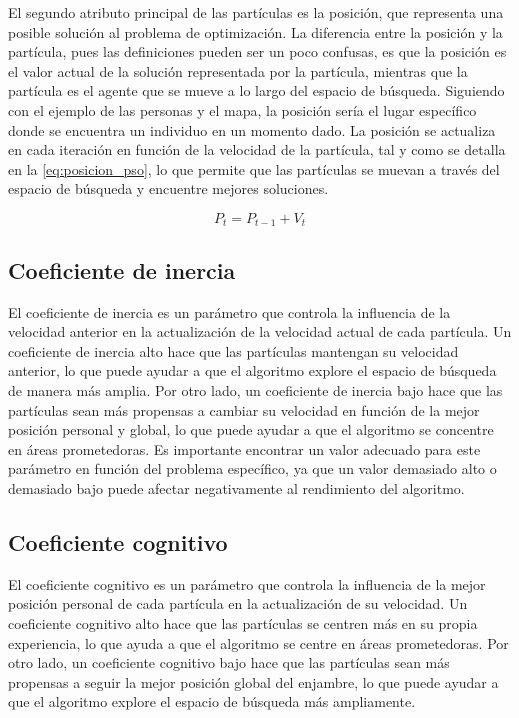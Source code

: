 El segundo atributo principal de las partículas es la posición, que representa una posible solución al problema de optimización. La diferencia entre la posición y la partícula, pues las definiciones pueden ser un poco confusas, es que la posición es el valor actual de la solución representada por la partícula, mientras que la partícula es el agente que se mueve a lo largo del espacio de búsqueda. Siguiendo con el ejemplo de las personas y el mapa, la posición sería el lugar específico donde se encuentra un individuo en un momento dado. La posición se actualiza en cada iteración en función de la velocidad de la partícula, tal y como se detalla en la \autoref{eq:posicion_pso}, lo que permite que las partículas se muevan a través del espacio de búsqueda y encuentre mejores soluciones.

\begin{equation}\label{eq:posicion_pso}
    P_t = P_{t-1} + V_t
\end{equation}

\subsection{Coeficiente de inercia}

El coeficiente de inercia es un parámetro que controla la influencia de la velocidad anterior en la actualización de la velocidad actual de cada partícula. Un coeficiente de inercia alto hace que las partículas mantengan su velocidad anterior, lo que puede ayudar a que el algoritmo explore el espacio de búsqueda de manera más amplia. Por otro lado, un coeficiente de inercia bajo hace que las partículas sean más propensas a cambiar su velocidad en función de la mejor posición personal y global, lo que puede ayudar a que el algoritmo se concentre en áreas prometedoras. Es importante encontrar un valor adecuado para este parámetro en función del problema específico, ya que un valor demasiado alto o demasiado bajo puede afectar negativamente al rendimiento del algoritmo.

\subsection{Coeficiente cognitivo}

El coeficiente cognitivo es un parámetro que controla la influencia de la mejor posición personal de cada partícula en la actualización de su velocidad. Un coeficiente cognitivo alto hace que las partículas se centren más en su propia experiencia, lo que ayuda a que el algoritmo se centre en áreas prometedoras. Por otro lado, un coeficiente cognitivo bajo hace que las partículas sean más propensas a seguir la mejor posición global del enjambre, lo que puede ayudar a que el algoritmo explore el espacio de búsqueda más ampliamente.

